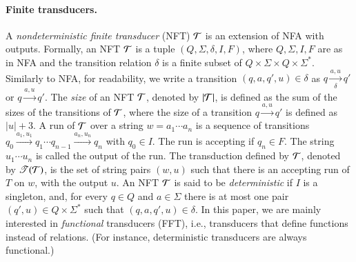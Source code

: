  



\paragraph*{Finite transducers.} A \emph{nondeterministic finite transducer} (NFT) $\mathcal{T}$ is an extension of NFA with outputs. Formally, an NFT $\mathcal{T}$ is a tuple $(Q, \Sigma, \delta, I, F)$, where $Q, \Sigma, I, F$ are as in NFA and the transition relation $\delta$ is a finite subset of $Q \times \Sigma \times Q \times \Sigma^*$. Similarly to NFA, for readability, we write a transition $(q, a, q', u) \in \delta$ as $q \xrightarrow[\delta]{a, u} q'$ or $q \xrightarrow{a, u} q'$. The \emph{size} of an NFT $\mathcal{T}$, denoted by $|\mathcal{T}|$, is defined as the sum of the sizes of the transitions of $\mathcal{T}$, where the size of a transition $q \xrightarrow{a, u} q'$ is defined as $|u|+3$.
%
A run of $\mathcal{T}$ over a string $w=a_1 \cdots a_n$ is a sequence of transitions $q_0 \xrightarrow{a_1, u_1} q_1 \cdots q_{n-1} \xrightarrow{a_n, u_n} q_n$ with $q_0 \in I$. The run is accepting if $q_n \in F$. The string $u_1 \cdots u_n$ is called the output of the run. The transduction defined by $\mathcal{T}$, denoted by $\mathscr{T}(\mathcal{T})$, is the set of string pairs $(w, u)$ such that there is an accepting run of $T$ on $w$, with the output $u$. An NFT $\mathcal{T}$ is said to be \emph{deterministic} if $I$ is a singleton, and, for every $q \in Q$ and $a \in \Sigma$  there is at most one pair $(q', u) \in Q \times \Sigma^*$ such that $(q, a, q', u) \in \delta$.
%
In this paper, we are mainly interested in \emph{functional} transducers (FFT), i.e., transducers that define functions instead of relations.
(For instance, deterministic transducers are always functional.)


